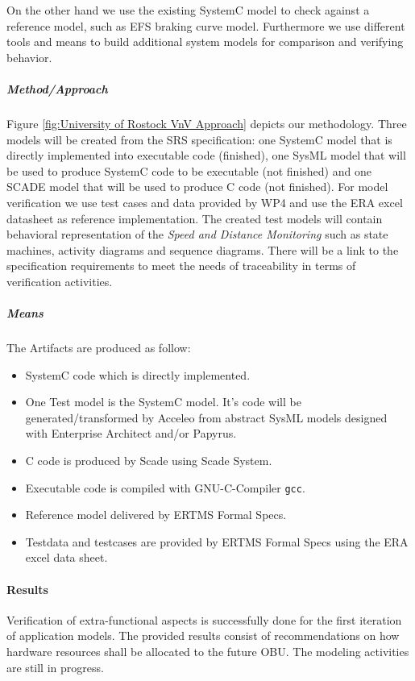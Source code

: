 \documentclass{article}
\begin{document}
On the other hand we use the existing SystemC model to check against a reference model, such as EFS braking curve model. Furthermore we use different tools and means to build additional system models for comparison and verifying behavior.

\subparagraph{Method/Approach}

Figure \ref{fig:University of Rostock VnV Approach} depicts our methodology. Three models will be created from the SRS
specification: one SystemC model that is directly implemented into executable code (finished), one SysML model that will be used to produce SystemC code to be executable (not finished) and one SCADE model that will be used to produce C code (not finished). For model verification we use test cases and data provided by WP4 and use the ERA excel datasheet as reference implementation. The created test models will contain behavioral representation of the \emph{Speed and Distance Monitoring} such as state machines, activity diagrams and sequence diagrams. There will be a link to the specification requirements to meet the needs of traceability in terms of verification activities.


\subparagraph{Means}

The Artifacts are produced as follow:
\begin{itemize}
\item SystemC code which is directly implemented.
\item One Test model is the SystemC model. It's code will be generated/transformed by Acceleo from abstract SysML models designed with Enterprise Architect and/or Papyrus.
\item C code is produced by Scade using Scade System.
\item Executable code is compiled with GNU-C-Compiler \texttt{gcc}.
\item Reference model delivered by ERTMS Formal Specs.
\item Testdata and testcases are provided by ERTMS Formal Specs using the ERA excel data sheet.
\end{itemize}

\paragraph{Results}

Verification of extra-functional aspects is successfully done for the first iteration of application models. The provided results consist of recommendations on how hardware resources shall be allocated to the future OBU. The modeling activities are still in progress.
\end{document}
